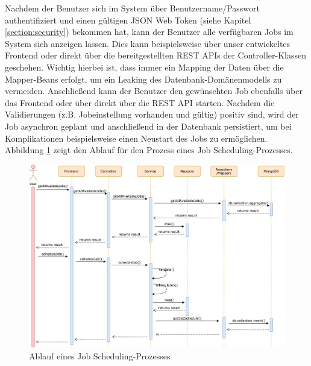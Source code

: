 
Nachdem der Benutzer sich im System über Benutzername/Passwort authentifiziert und einen gültigen JSON Web Token (siehe Kapitel \ref{section:security}) bekommen hat, kann der Benutzer alle verfügbaren Jobs im System sich anzeigen lassen. Dies kann beispielsweise über unser entwickeltes Frontend oder direkt über die bereitgestellten REST APIs der Controller-Klassen geschehen. Wichtig hierbei ist, dass immer ein Mapping der Daten über die Mapper-Beans erfolgt, um ein Leaking des Datenbank-Domänenmodells zu vermeiden. Anschließend kann der Benutzer den gewünschten Job ebenfalls über das Frontend oder über direkt über die REST API starten. Nachdem die Validierungen (z.B. Jobeinstellung vorhanden und gültig) positiv sind, wird der Job asynchron geplant und anschließend in der Datenbank persistiert, um bei Komplikationen beispielsweise einen Neustart des Jobs zu ermöglichen. Abbildung \ref{fig:Ablauf eines Job Scheduling-Prozesses} zeigt den Ablauf für den Prozess eines Job Scheduling-Prozesses.


\begin{figure}[!h]
\centering
\includegraphics[width=15cm]{images/00_software_architecture/03_job_scheduling_process/scheduling_process.jpg}
\caption{Ablauf eines Job Scheduling-Prozesses}
\label{fig:Ablauf eines Job Scheduling-Prozesses}
\end{figure}

